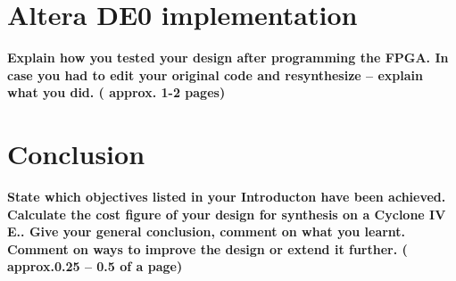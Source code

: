 \section{Altera DE0 implementation}

{
	\color{red} \bfseries
	Explain how you tested your design after  programming the FPGA. In case you had to edit your original code and resynthesize – explain what you did.  ( approx. 1-2 pages)
}

\section{Conclusion}

{
	\color{red} \bfseries
	State which objectives listed in your Introducton have been achieved. Calculate the cost figure of your design for synthesis on a Cyclone IV E.. Give your general  conclusion, comment on what you learnt.  Comment on ways to improve the design or extend it further.  ( approx.0.25 – 0.5 of a page)
}